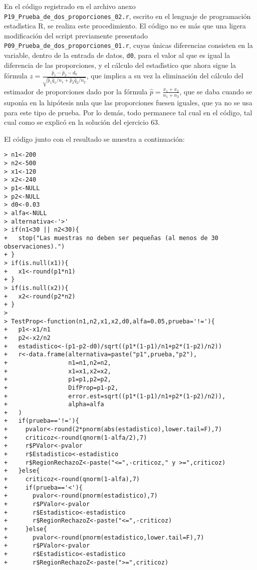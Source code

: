 \begin{solucion}
 En el c\'odigo registrado en el archivo anexo
 \texttt{P19\_Prueba\_de\_dos\_proporciones\_02.r},
 escrito en el lenguaje de programaci\'on estad\'{\i}stica R,
 se realiza este procedimiento.
 El c\'odigo no es m\'as que una ligera modificaci\'on del script
 previamente presentado
 \texttt{P09\_Prueba\_de\_dos\_proporciones\_01.r},
 cuyas \'unicas diferencias consisten en la variable,
 dentro de la entrada de datos, \texttt{d0},
 para el valor al que es igual la diferencia de las proporciones,
 y el c\'alculo del estad\'{\i}stico que ahora sigue la f\'ormula
 $z = \frac{\widehat{p}_1-\widehat{p}_2-d_0}{\sqrt{
 \widehat{p}_1\widehat{q}_1/n_1 + \widehat{p}_2\widehat{q}_2/n_2}}$,
 que implica a su vez la eliminaci\'on del c\'alculo del estimador
 de proporciones dado por la f\'ormula
 $\widehat{p} = \frac{x_1+x_2}{n_1+n_2}$, que se daba
 cuando se supon\'{\i}a en la hip\'otesis nula que las proporciones fuesen
 iguales, que ya no se usa para este tipo de prueba.
 Por lo dem\'as, todo permanece tal cual en el c\'odigo,
 tal cual como se explic\'o en la soluci\'on del ejercicio 63.
 \par 
 El c\'odigo junto con el resultado se muestra a continuaci\'on:
 \begin{verbatim}
> n1<-200
> n2<-500
> x1<-120
> x2<-240
> p1<-NULL
> p2<-NULL
> d0<-0.03
> alfa<-NULL
> alternativa<-'>'
> if(n1<30 || n2<30){
+   stop("Las muestras no deben ser pequeñas (al menos de 30 observaciones).")
+ }
> if(is.null(x1)){
+   x1<-round(p1*n1)
+ }
> if(is.null(x2)){
+   x2<-round(p2*n2)
+ }
> 
> TestProp<-function(n1,n2,x1,x2,d0,alfa=0.05,prueba='!='){
+   p1<-x1/n1
+   p2<-x2/n2
+   estadistico<-(p1-p2-d0)/sqrt((p1*(1-p1)/n1+p2*(1-p2)/n2))
+   r<-data.frame(alternativa=paste("p1",prueba,"p2"),
+                 n1=n1,n2=n2,
+                 x1=x1,x2=x2,
+                 p1=p1,p2=p2,
+                 DifProp=p1-p2,
+                 error.est=sqrt((p1*(1-p1)/n1+p2*(1-p2)/n2)),
+                 alpha=alfa
+   )
+   if(prueba=='!='){
+     pvalor<-round(2*pnorm(abs(estadistico),lower.tail=F),7)
+     criticoz<-round(qnorm(1-alfa/2),7)
+     r$PValor<-pvalor
+     r$Estadistico<-estadistico
+     r$RegionRechazoZ<-paste("<=",-criticoz," y >=",criticoz)
+   }else{
+     criticoz<-round(qnorm(1-alfa),7)
+     if(prueba=='<'){
+       pvalor<-round(pnorm(estadistico),7)
+       r$PValor<-pvalor
+       r$Estadistico<-estadistico
+       r$RegionRechazoZ<-paste("<=",-criticoz)
+     }else{
+       pvalor<-round(pnorm(estadistico,lower.tail=F),7)
+       r$PValor<-pvalor
+       r$Estadistico<-estadistico
+       r$RegionRechazoZ<-paste(">=",criticoz)

\end{verbatim}
\end{solucion}
